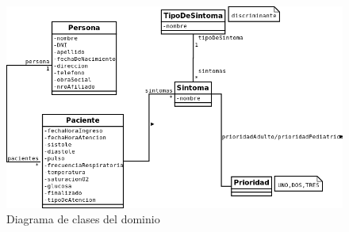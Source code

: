\begin{figure}[h]
\centerline{\includegraphics[width=1.2\textwidth]{triage.png}}
\caption{Diagrama de clases del dominio}
\end{figure}